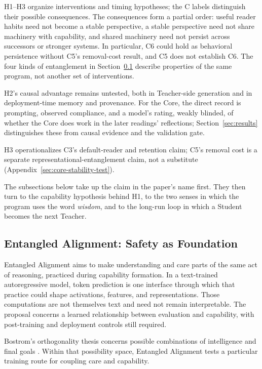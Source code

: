 \documentclass[11pt]{article}
\begin{document}
H1--H3 organize interventions and timing hypotheses; the C labels
distinguish their possible consequences. The consequences form a partial order:
useful reader habits need not become a stable perspective, a stable
perspective need not share machinery with capability, and shared machinery
need not persist across successors or stronger systems. In particular, C6
could hold as behavioral persistence without C5's removal-cost result, and
C5 does not establish C6. The four kinds of entanglement in
Section~\ref{sec:entanglement} describe properties of the same program, not
another set of interventions.

H2's causal advantage remains untested, both in Teacher-side generation
and in deployment-time memory and provenance. For the Core, the direct record
is prompting, observed compliance, and a model's rating, weakly blinded, of
whether the Core does work in the later readings' reflections;
Section~\ref{sec:results} distinguishes these from causal evidence and the
validation gate.

H3 operationalizes C3's default-reader and retention claim; C5's removal cost
is a separate representational-entanglement claim, not a substitute
(Appendix~\ref{sec:core-stability-test}).

The subsections below take up the claim in the paper's name first. They then
turn to the capability hypothesis behind H1, to the two senses in which the
program uses the word \emph{wisdom}, and to the long-run loop in which a
Student becomes the next Teacher.

	\subsection{Entangled Alignment: Safety as Foundation}\label{sec:entanglement}
	
		Entangled Alignment aims to make understanding and care parts of the same
act of reasoning, practiced during capability formation. In a text-trained
autoregressive model, token prediction is one interface through which that
practice could shape activations, features, and representations. Those
computations are not themselves text and need not remain interpretable. The
proposal concerns a learned relationship between evaluation and capability,
with post-training and deployment controls still required.

Bostrom's orthogonality thesis concerns possible combinations of intelligence
and final goals \cite{bostrom2012superintelligentwill}. Within that possibility
space, Entangled Alignment tests a particular training route for coupling care and capability.
\end{document}
